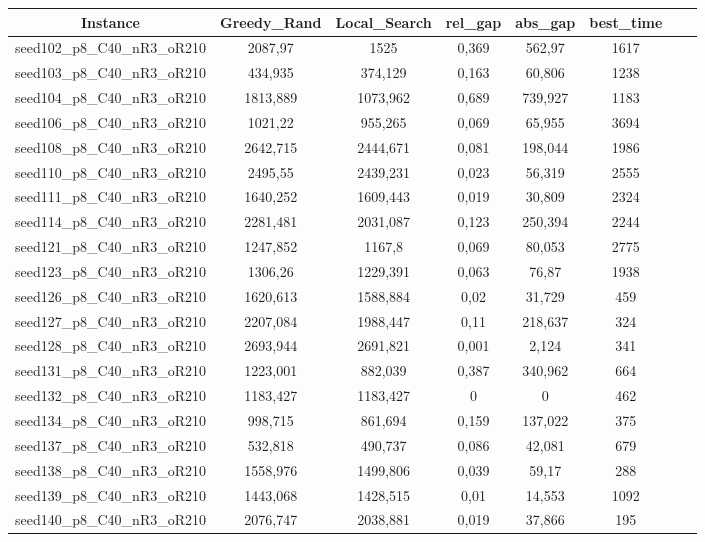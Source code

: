 \documentclass[a4paper]{article}
\begin{document}
\begin{center}
\begin{longtable}{cccccccc}
\tabularnewline
\hline
Instance & Greedy\_Rand & Local\_Search & rel\_gap & abs\_gap & best\_time\\
\hline
seed102\_p8\_C40\_nR3\_oR210 & 2087,97 & 1525 & 0,369 & 562,97 & 1617\\
\hline
seed103\_p8\_C40\_nR3\_oR210 & 434,935 & 374,129 & 0,163 & 60,806 & 1238\\
\hline
seed104\_p8\_C40\_nR3\_oR210 & 1813,889 & 1073,962 & 0,689 & 739,927 & 1183\\
\hline
seed106\_p8\_C40\_nR3\_oR210 & 1021,22 & 955,265 & 0,069 & 65,955 & 3694\\
\hline
seed108\_p8\_C40\_nR3\_oR210 & 2642,715 & 2444,671 & 0,081 & 198,044 & 1986\\
\hline
seed110\_p8\_C40\_nR3\_oR210 & 2495,55 & 2439,231 & 0,023 & 56,319 & 2555\\
\hline
seed111\_p8\_C40\_nR3\_oR210 & 1640,252 & 1609,443 & 0,019 & 30,809 & 2324\\
\hline
seed114\_p8\_C40\_nR3\_oR210 & 2281,481 & 2031,087 & 0,123 & 250,394 & 2244\\
\hline
seed121\_p8\_C40\_nR3\_oR210 & 1247,852 & 1167,8 & 0,069 & 80,053 & 2775\\
\hline
seed123\_p8\_C40\_nR3\_oR210 & 1306,26 & 1229,391 & 0,063 & 76,87 & 1938\\
\hline
seed126\_p8\_C40\_nR3\_oR210 & 1620,613 & 1588,884 & 0,02 & 31,729 & 459\\
\hline
seed127\_p8\_C40\_nR3\_oR210 & 2207,084 & 1988,447 & 0,11 & 218,637 & 324\\
\hline
seed128\_p8\_C40\_nR3\_oR210 & 2693,944 & 2691,821 & 0,001 & 2,124 & 341\\
\hline
seed131\_p8\_C40\_nR3\_oR210 & 1223,001 & 882,039 & 0,387 & 340,962 & 664\\
\hline
seed132\_p8\_C40\_nR3\_oR210 & 1183,427 & 1183,427 & 0 & 0 & 462\\
\hline
seed134\_p8\_C40\_nR3\_oR210 & 998,715 & 861,694 & 0,159 & 137,022 & 375\\
\hline
seed137\_p8\_C40\_nR3\_oR210 & 532,818 & 490,737 & 0,086 & 42,081 & 679\\
\hline
seed138\_p8\_C40\_nR3\_oR210 & 1558,976 & 1499,806 & 0,039 & 59,17 & 288\\
\hline
seed139\_p8\_C40\_nR3\_oR210 & 1443,068 & 1428,515 & 0,01 & 14,553 & 1092\\
\hline
seed140\_p8\_C40\_nR3\_oR210 & 2076,747 & 2038,881 & 0,019 & 37,866 & 195\\

\end{longtable}
\end{center}
\end{document}
